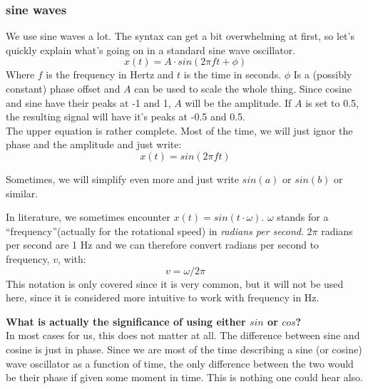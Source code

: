 \subsubsection{sine waves}
We use sine waves a lot. The syntax can get a bit overwhelming at first, so let's quickly explain what's going on in a standard sine wave oscillator.
\begin{equation}
	x(t) = A \cdot sin(2\pi f t + \phi)
\end{equation}
Where $f$ is the frequency in Hertz and $t$ is the time in seconds. $\phi$ Is a (possibly constant) phase offset and $A$ can be used to scale the whole thing. Since cosine and sine have their peaks at -1 and 1, $A$ will be the amplitude. If $A$ is set to 0.5, the resulting signal will have it's peaks at -0.5 and 0.5. \\
The upper equation is rather complete. Most of the time, we will just ignor the phase and the amplitude and just write:
\begin{equation}
	x(t) = sin(2\pi f t )
\end{equation}

Sometimes, we will simplify even more and just write $sin(a)$ or $sin(b)$ or similar.\\
\begin{mdframed}[backgroundcolor=black!10,rightline=false,leftline=false]
In literature, we sometimes encounter $x(t) = sin(t \cdot \omega)$. $\omega$ stands for a ``frequency''(actually for the rotational speed) in \textit{radians per second}. $2\pi$ radians per second are 1 Hz and we can therefore convert radians per second to frequency, $v$, with:
\begin{equation}
  	v = \omega / 2\pi
  \end{equation}  
This notation is only covered since it is very common, but it will not be used here, since it is considered more intuitive to work with frequency in Hz.
\vspace{0.5cm}

\textbf{What is actually the significance of using either $sin$ or $cos$?}\\
In most cases for us, this does not matter at all. The difference between sine and cosine is just in phase. Since we are most of the time describing a sine (or cosine) wave oscillator as a function of time, the only difference between the two would be their phase if given some moment in time. This is nothing one could hear also.

\end{mdframed}






